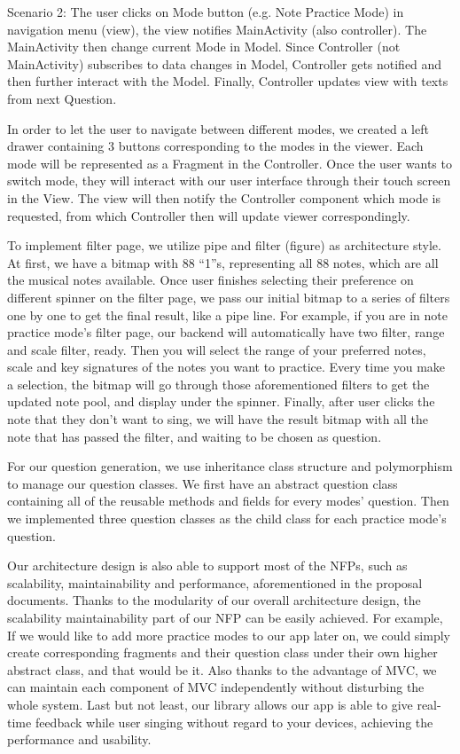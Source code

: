 \documentclass{article}
\begin{document}
Scenario 2:
The user clicks on Mode button (e.g. Note Practice Mode) in navigation menu (view), the view notifies MainActivity (also controller). The MainActivity then change current Mode in Model. Since Controller (not MainActivity) subscribes to data changes in Model, Controller gets notified and then further interact with the Model. Finally, Controller updates view with texts from next Question.


In order to let the user to navigate between different modes, we created a left drawer containing 3 buttons corresponding to the modes in the viewer. Each mode will be represented as a Fragment in the Controller. Once the user wants to switch mode, they will interact with our user interface through their touch screen in the View. The view will then notify the Controller component which mode is requested, from which Controller then will update viewer correspondingly.


To implement filter page, we utilize pipe and filter (figure) as architecture style. At first, we have a bitmap with 88 “1”s, representing all 88 notes, which are all the musical notes available. Once user finishes selecting their preference on different spinner on the filter page, we pass our initial bitmap to a series of filters one by one to get the final result, like a pipe line. For example, if you are in note practice mode’s filter page, our backend will automatically have two filter, range and scale filter, ready. Then you will select the range of your preferred notes, scale and key signatures of the notes you want to practice. Every time you make a selection, the bitmap will go through those aforementioned filters to get the updated note pool, and display under the spinner. Finally, after user clicks the note that they don’t want to sing, we will have the result bitmap with all the note that has passed the filter, and waiting to be chosen as question.

\qquad

For our question generation, we use inheritance class structure and polymorphism to manage our question classes. We first have an abstract question class containing all of the reusable methods and fields for every modes’ question. Then we implemented three question classes as the child class for each practice mode’s question. 
 
\qquad

Our architecture design is also able to support most of the NFPs, such as scalability, maintainability and performance, aforementioned in the proposal documents. Thanks to the modularity of our overall architecture design, the scalability maintainability part of our NFP can be easily achieved. For example, If we would like to add more practice modes to our app later on, we could simply create corresponding fragments and their question class under their own higher abstract class, and that would be it. Also thanks to the advantage of MVC, we can maintain each component of MVC independently without disturbing the whole system. Last but not least, our library allows our app is able to give real-time feedback while user singing without regard to your devices, achieving the performance and usability.
\end{document}
